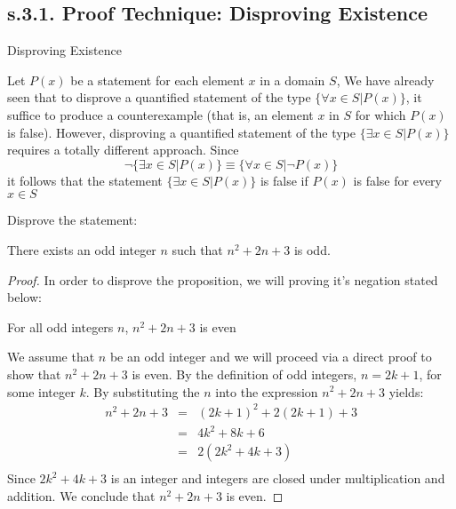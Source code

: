 \newpage
\subsection{s.3.1. Proof Technique: Disproving Existence}
\begin{definition}

Disproving Existence

Let $P(x)$ be a statement for each element $x$ in a domain $S$, We have already seen that to disprove a quantified statement  of the type $\{ \forall x \in S | P(x) \}$, it suffice to produce a counterexample (that is, an element $x$ in $S$ for which $P(x)$ is false). However, disproving a quantified statement of the type $\{ \exists x \in S | P(x) \}$ requires a totally different approach. Since
	\begin{equation}
		\neg \{ \exists x \in S | P(x) \} \equiv \{ \forall x \in S | \neg P(x) \}
	\end{equation}
it follows that the statement $\{ \exists x \in S | P(x) \}$ is false if $P(x)$ is false for every $x \in S$
\end{definition}


\begin{example}
Disprove the statement:

\begin{tcolorbox}
	\begin{theorem}
	\label{the2}		
		There exists an odd integer $n$ such that $n^2 + 2n + 3$ is odd. 
	\end{theorem}
\end{tcolorbox}

\begin{proof}
In order to disprove the proposition, we will proving it's negation stated below: \\
	\begin{center}
		For all odd integers $n$, $n^2 + 2n + 3$ is even
	\end{center}
We assume that $n$ be an odd integer and we will proceed via a direct proof to show that $n^2 + 2n + 3$ is even. By the definition of odd integers, $n = 2k + 1$, for some integer $k$. By substituting the $n$ into the expression $n^2 + 2n + 3$ yields:
	\begin{eqnarray*}
		n^2 + 2n + 3 & = & (2k + 1)^2 + 2(2k + 1) + 3 \nonumber \\
		& = & 4k^2 + 8k + 6 \nonumber \\
		& = & 2(2k^2 + 4k + 3) \nonumber \\
	\end{eqnarray*}	 
Since $2k^2 + 4k + 3$ is an integer and integers are closed under multiplication and addition. We conclude that $n^2 + 2n + 3$ is even. 
\end{proof}
\end{example}

